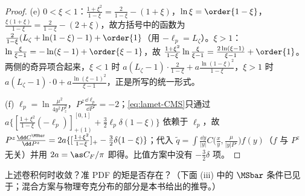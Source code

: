 \begin{proof}
(e) $0<\xi<1$：$\frac{1+\xi^2}{1-\xi}=\frac2{1-\xi}-(1+\xi)$，$\ln\xi=\order{1-\xi}$，$\frac{\xi(1+\xi)}{1-\xi}=\frac2{1-\xi}-(2+\xi)$，故方括号中的函数为 $\frac2{1-\xi}(L_\zeta+\ln(1-\xi)-1)+\order{1}$（用 $-\ell_p=L_\zeta$）。$\xi>1$：$\ln\frac\xi{\xi-1}=-\ln(\xi-1)+\order{\xi-1}$，故 $\frac{1+\xi^2}{1-\xi}\ln\frac\xi{\xi-1}=\frac{2\ln(\xi-1)}{\xi-1}+\order{1}$。两侧的奇异项合起来，$\xi<1$ 时 $a(L_\zeta-1)\cdot\frac2{1-\xi}+a\frac{\ln(1-\xi)^2}{1-\xi}$，$\xi>1$ 时 $a(L_\zeta-1)\cdot0+a\frac{\ln(\xi-1)^2}{\xi-1}$，正是所写的统一形式。

(f) $\ell_p=\ln\frac{\mu^2}{4y^2P_z^2}$，$P^z\frac{\dd\ell_p}{\dd P^z}=-2$；\cref{eq:lamet-CMS}只通过 $a\{[\frac{1+\xi^2}{1-\xi}(-\ell_p)]^{[0,1]}_{+(1)}+\frac32\ell_p\delta(1-\xi)\}$ 依赖于 $\ell_p$，故 $P^z\frac{\dd C^{\MSbar}}{\dd P^z}=2a\{[\frac{1+\xi^2}{1-\xi}]_+-\frac32\delta(1-\xi)\}$；代入 $\tilde q=\int\frac{\dd y}{|y|}C\big(\frac xy,\frac\mu{|y|P^z}\big)f(y)$（$f$ 与 $P^z$ 无关）并用 $2a=\as C_F/\pi$ 即得。比值方案中没有 $-\frac32\delta$ 项。
\end{proof}

上述卷积何时收敛？准 PDF 的矩是否存在？（下面 (iii) 中的 $\MSbar$ 条件已见于\cite{IzubuchiEtAl2018}；混合方案与物理夸克分布的部分是本书给出的推导。）

